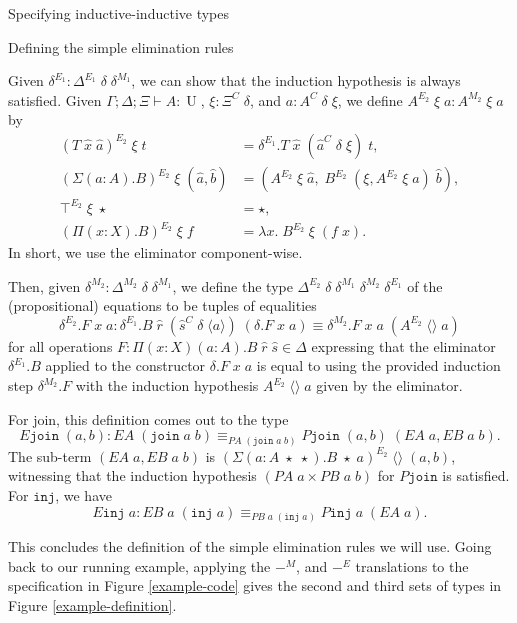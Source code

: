 \documentclass[runningheads]{llncs}
\DeclareMathOperator{\UU}{U}
\newcommand{\Id}[2]{{#1}\equiv{#2}}
\newcommand{\IdA}[3]{{#1}\equiv_{#3}{#2}}
\newcommand{\tac}{\vdash}
\newcommand{\join}{\texttt{join}}
\newcommand{\inj}{\texttt{inj}}
\def\emptytuple{\langle\rangle}
\begin{document}
{\begin{section}{Specifying inductive-inductive types}
\begin{subsection}{\label{simple-elim-section}Defining the simple elimination rules}
\begin{definition}
Given $\delta^{E_1} : \Delta^{E_1}\;\delta\;\delta^{M_1}$, we can show that the induction hypothesis is always satisfied. Given $\Gamma ; \Delta ; \Xi \tac A : \UU$, $\xi : \Xi^C\;\delta$, and $a : A^C\;\delta\;\xi$, we define $A^{E_2}\;\xi\;a : A^{M_2}\;\xi\;a$ by
\begin{align*}
(T\;\hat{x}\;\hat{a})^{E_2}\;\xi\;t &= \delta^{E_1}.T\;\hat{x}\;(\hat{a}^C\;\delta\;\xi)\;t,\\
(\Sigma(a : A).B)^{E_2}\;\xi\;(\hat{a},\hat{b}) &= (A^{E_2}\;\xi\;\hat{a} ,\; B^{E_2}\;(\xi , A^{E_2}\;\xi\;a)\;\hat{b}),\\
\top^{E_2}\;\xi\;\star &= \star,\\
(\Pi(x : X).B)^{E_2}\;\xi\;f &= \lambda x.\; B^{E_2}\;\xi\;(f\;x).
\end{align*}
In short, we use the eliminator component-wise.

Then, given $\delta^{M_2} : \Delta^{M_2}\;\delta\;\delta^{M_1}$, we define the type $\Delta^{E_2}\;\delta\;\delta^{M_1}\;\delta^{M_2}\;\delta^{E_1}$ of the (propositional) equations to be tuples of equalities \[\delta^{E_2}.F\;x\;a : \Id{\delta^{E_1}.B\;\hat{r}\;(\hat{s}^C\;\delta\;\langle a \rangle)\;(\delta.F\;x\;a)}{\delta^{M_2}.F\;x\;a\;(A^{E_2}\;\emptytuple\;a)}\] for all operations $F : \Pi(x : X)(a : A).B\;\hat{r}\;\hat{s} \in\Delta$ expressing that the eliminator $\delta^{E_1}.B$ applied to the constructor $\delta.F\;x\;a$ is equal to using the provided induction step $\delta^{M_2}.F$ with the induction hypothesis $A^{E_2}\;\emptytuple\;a$ given by the eliminator.
\end{definition}

For join, this definition comes out to the type \[E\join\;(a, b) : \IdA{EA\;(\join\;a\;b)}{P\join\;(a,b)\;(EA\;a, EB\;a\;b)}{PA\;(\join\;a\;b)}.\] The sub-term $(EA\;a, EB\;a\;b)$ is $(\Sigma(a : A\;\star\;\star).B\;\star\;a)^{E_2}\;\emptytuple\;(a, b)$, witnessing that the induction hypothesis $(PA\;a \times PB\;a\;b)$ for $P\join$ is satisfied. For $\inj$, we have \[E\inj\;a : \IdA{EB\;a\;(\inj\;a)}{P\inj\;a\;(EA\;a)}{PB\;a\;(\inj\;a)}.\]

This concludes the definition of the simple elimination rules we will use. Going back to our running example, applying the $-^M$, and $-^E$ translations to the specification in Figure \ref{example-code} gives the second and third sets of types in Figure \ref{example-definition}.


\end{subsection}
\end{section}}
\end{document}
